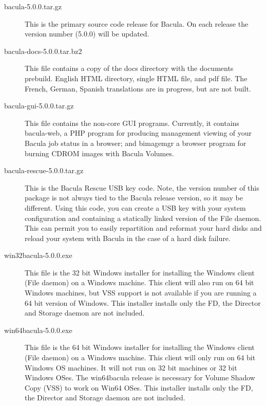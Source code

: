 \begin{description}
\item [bacula-5.0.0.tar.gz]
  This is the primary source code release for Bacula. On each
  release the version number (5.0.0) will be updated.

\item [bacula-docs-5.0.0.tar.bz2]
  This file contains a copy of the docs directory with the
  documents prebuild. English HTML directory, single HTML
  file, and pdf file. The French, German, Spanish translations
  are in progress, but are not built.

\item [bacula-gui-5.0.0.tar.gz]
  This file contains the non-core GUI programs. Currently,
  it contains bacula-web, a PHP program for producing management
  viewing of your Bacula job status in a browser; and bimagemgr
  a browser program for burning CDROM images with Bacula Volumes.

\item [bacula-rescue-5.0.0.tar.gz]
  This is the Bacula Rescue USB key code. Note, the version number
  of this package is not always tied to the Bacula release version, so
  it may be different.  Using this code, you can create a USB key
  with your system configuration and containing a statically
  linked version of the File daemon. This can permit you to easily
  repartition and reformat your hard disks and reload your
  system with Bacula in the case of a hard disk failure.

\item [win32bacula-5.0.0.exe]
  This file is the 32 bit Windows installer for installing
  the Windows client (File daemon) on a Windows machine.
  This client will also run on 64 bit Windows machines, but
  VSS support is not available if you are running a 64 bit
  version of Windows.  This installer installs only the FD, 
  the Director and Storage daemon are not included.


\item [win64bacula-5.0.0.exe]
  This file is the 64 bit Windows installer for installing
  the Windows client (File daemon) on a Windows machine.
  This client will only run on 64 bit Windows OS machines.
  It will not run on 32 bit machines or 32 bit Windows OSes.
  The win64bacula release is necessary for Volume Shadow
  Copy (VSS) to work on Win64 OSes.  This installer
  installs only the FD, the Director and Storage daemon
  are not included.

\end{description}

